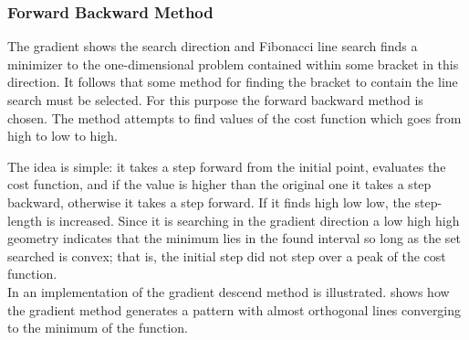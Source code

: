 \subsubsection{Forward Backward Method}
The gradient shows the search direction and Fibonacci line search finds a minimizer to the one-dimensional problem contained within some bracket in this direction. It follows that some method for finding the bracket to contain the line search must be selected. For this purpose the forward backward method is chosen. The method attempts to find values of the cost function which goes from high to low to high.

The idea is simple: it takes a step forward from the initial point, evaluates the cost function, and if the value is higher than the original one it takes a step backward, otherwise it takes a step forward. If it finds high low low, the step-length is increased. Since it is searching in the gradient direction a low high high geometry indicates that the minimum lies in the found interval so long as the set searched is convex; that is, the initial step did not step over a peak of the cost function.\\
In  an implementation of the gradient descend method is illustrated.  shows how the gradient method generates a pattern with almost orthogonal lines converging to the minimum of the function.

